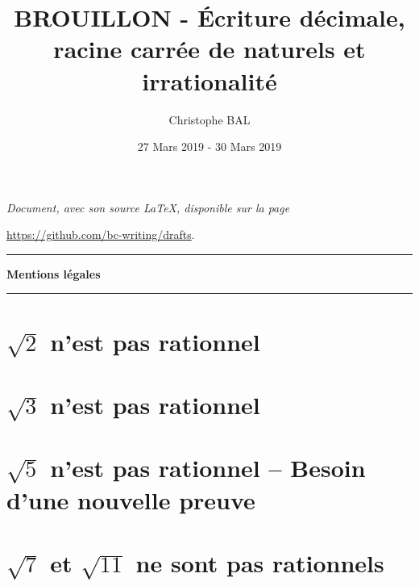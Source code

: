 \documentclass[12pt]{amsart}
\begin{document}
\title{BROUILLON - Écriture décimale, racine carrée de naturels et irrationalité}
\author{Christophe BAL}
\date{27 Mars 2019 - 30 Mars 2019}

\maketitle

\begin{center}
	\itshape
	Document, avec son source \LaTeX, disponible sur la page
	
	\url{https://github.com/bc-writing/drafts}.
\end{center}


\bigskip


\begin{center}
	\hrule\vspace{.3em}
	{
		\fontsize{1.35em}{1em}\selectfont
		\textbf{Mentions \og légales \fg}
	}
			
	\vspace{0.45em}
	\doclicenseThis
	\hrule
\end{center}


\setcounter{tocdepth}{2}
\tableofcontents



\section{$\sqrt2$ n'est pas rationnel}





\section{$\sqrt3$ n'est pas rationnel}




\section{$\sqrt5$ n'est pas rationnel -- Besoin d'une nouvelle preuve}





\section{$\sqrt7$ et $\sqrt{11}$ ne sont pas rationnels}
\end{document}
